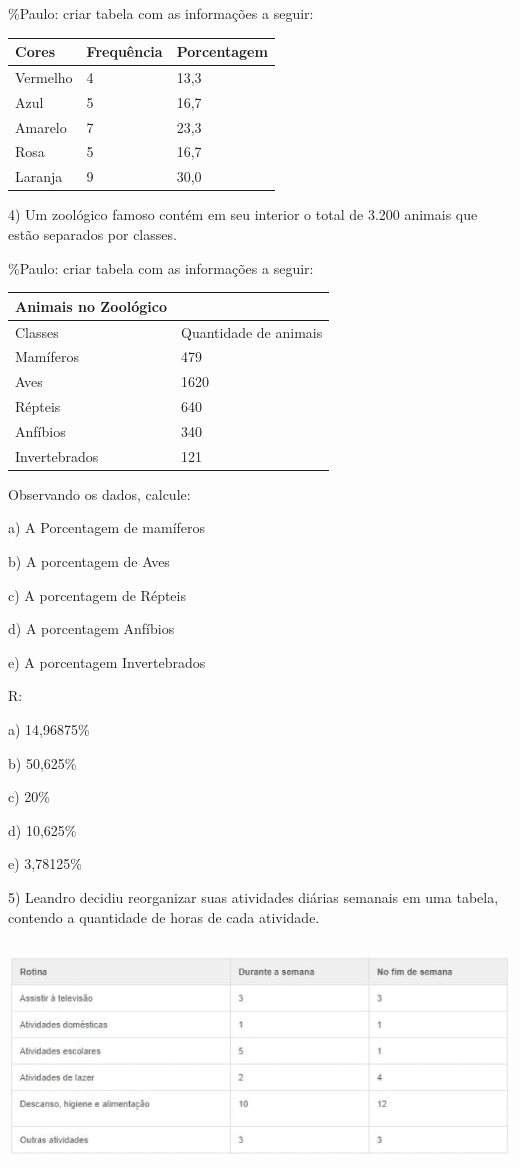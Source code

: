 \%Paulo: criar tabela com as informações a seguir:

\begin{longtable}[]{@{}lll@{}}
\toprule
Cores & Frequência & Porcentagem\tabularnewline
\midrule
\endhead
Vermelho & 4 & 13,3\tabularnewline
Azul & 5 & 16,7\tabularnewline
Amarelo & 7 & 23,3\tabularnewline
Rosa & 5 & 16,7\tabularnewline
Laranja & 9 & 30,0\tabularnewline
\bottomrule
\end{longtable}

4) Um zoológico famoso contém em seu interior o total de 3.200 animais
que estão separados por classes.

\%Paulo: criar tabela com as informações a seguir:

\begin{longtable}[]{@{}ll@{}}
\toprule
Animais no Zoológico &\tabularnewline
\midrule
\endhead
Classes & Quantidade de animais\tabularnewline
Mamíferos & 479\tabularnewline
Aves & 1620\tabularnewline
Répteis & 640\tabularnewline
Anfíbios & 340\tabularnewline
Invertebrados & 121\tabularnewline
\bottomrule
\end{longtable}

Observando os dados, calcule:

a) A Porcentagem de mamíferos

b) A porcentagem de Aves

c) A porcentagem de Répteis

d) A porcentagem Anfíbios

e) A porcentagem Invertebrados

R:

a) 14,96875\%

b) 50,625\%

c) 20\%

d) 10,625\%

e) 3,78125\%

5) Leandro decidiu reorganizar suas atividades diárias semanais em uma
tabela, contendo a quantidade de horas de cada atividade.

\includegraphics[width=5.90556in,height=2.41638in]{./imgSAEB_6_MAT/media/image83.png}

